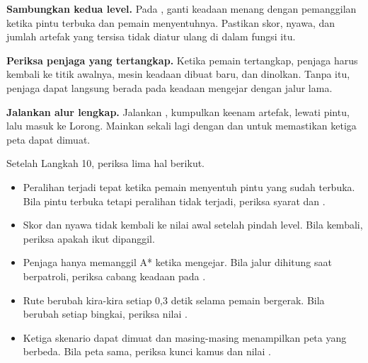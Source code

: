\begin{langkah}
  \item \textbf{Sambungkan kedua level.} Pada , ganti
        keadaan menang dengan pemanggilan  ketika pintu
        terbuka dan pemain menyentuhnya. Pastikan skor, nyawa, dan jumlah
        artefak yang tersisa tidak diatur ulang di dalam fungsi itu.

  \item \textbf{Periksa penjaga yang tertangkap.} Ketika pemain tertangkap,
        penjaga harus kembali ke titik awalnya, mesin keadaan dibuat baru,
        dan  dinolkan. Tanpa itu, penjaga dapat langsung
        berada pada keadaan mengejar dengan jalur lama.

  \item \textbf{Jalankan alur lengkap.} Jalankan ,
        kumpulkan keenam artefak, lewati pintu, lalu masuk ke Lorong. Mainkan
        sekali lagi dengan  dan
         untuk memastikan ketiga peta dapat dimuat.
\end{langkah}

\begin{ujibox}
Setelah Langkah 10, periksa lima hal berikut.
\begin{itemize}[leftmargin=1.4em, itemsep=0.2em]
  \item Peralihan terjadi tepat ketika pemain menyentuh pintu yang sudah
        terbuka. Bila pintu terbuka tetapi peralihan tidak terjadi, periksa
        syarat  dan .
  \item Skor dan nyawa tidak kembali ke nilai awal setelah pindah level.
        Bila kembali, periksa apakah  ikut dipanggil.
  \item Penjaga hanya memanggil A* ketika mengejar. Bila jalur dihitung saat
        berpatroli, periksa cabang keadaan pada .
  \item Rute berubah kira-kira setiap 0,3 detik selama pemain bergerak.
        Bila berubah setiap bingkai, periksa nilai .
  \item Ketiga skenario dapat dimuat dan masing-masing menampilkan peta yang
        berbeda. Bila peta sama, periksa kunci kamus dan nilai
        .
\end{itemize}
\end{ujibox}


